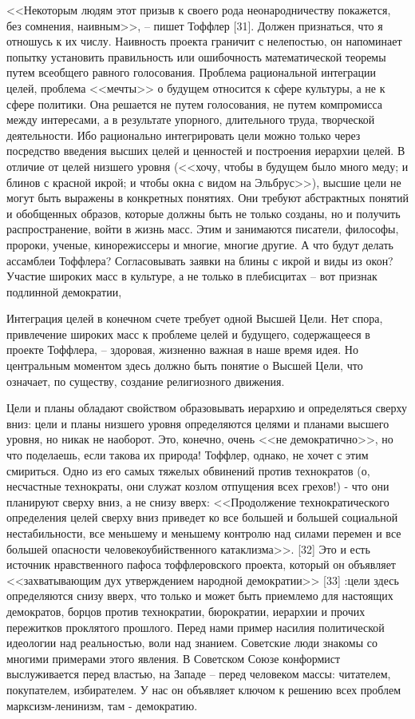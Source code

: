 \documentclass{book}
\begin{document}
{<<Некоторым людям этот призыв к своего рода неонародни­честву покажется, без сомнения, наивным>>, -- пишет Тоф­флер [31]. Должен признаться, что я отношусь к их числу. Наив­ность проекта граничит с нелепостью, он напоминает попытку установить правильность или ошибочность математической те­оремы путем всеобщего равного голосования. Проблема раци­ональной интеграции целей, проблема <<мечты>> о будущем от­носится к сфере культуры, а не к сфере политики. Она решает­ся не путем голосования, не путем компромисса между инте­ресами, а в результате упорного, длительного труда, творче­ской деятельности. Ибо рационально интегрировать цели можно только через посредство введения высших целей и ценностей и построения иерархии целей. В отличие от целей низшего уров­ня (<<хочу, чтобы в будущем было много меду; и блинов с крас­ной икрой; и чтобы окна с видом на Эльбрус>>), высшие цели не могут быть выражены в конкретных понятиях. Они требуют абстрактных понятий и обобщенных образов, которые должны быть не только созданы, но и 
получить распространение, войти в жизнь масс. Этим и занимаются писатели, философы, пророки, ученые, кинорежиссеры и многие, многие другие. А что будут делать ассамблеи Тоффлера? Согласовывать заявки на блины с икрой и виды из окон? Участие широких масс в культуре, а не только в плебисцитах -- вот признак подлинной демокра­тии,

Интеграция целей в конечном счете требует одной Высшей Цели. Нет спора, привлечение широких масс к проблеме целей и будущего, содержащееся в проекте Тоффлера, -- здоровая, жизненно важная в наше время идея. Но центральным момен­том здесь должно быть понятие о Высшей Цели, что означает, по существу, создание религиозного движения.

Цели и планы обладают свойством образовывать иерархию и определяться сверху вниз: цели и планы низшего уровня определяются целями и планами высшего уровня, но никак не наоборот. Это, конечно, очень <<не демократично>>, но что поде­лаешь, если такова их природа! Тоффлер, однако, не хочет с этим смириться. Одно из его самых тяжелых обвинений против технократов (о, несчастные технократы, они служат козлом отпущения всех грехов!) - что они планируют сверху вниз, а не снизу вверх: <<Продолжение технократического определения целей сверху вниз приведет ко все большей и большей социаль­ной нестабильности, все меньшему и меньшему контролю над си­лами перемен и все большей опасности человекоубийственного катаклизма>>. [32] Это и есть источник нравственного пафоса тоффлеровского проекта, который он объявляет <<захватыва­ющим дух утверждением народной демократии>> [33] :цели здесь определяются снизу вверх, что только и может быть приемлемо для настоящих демократов, борцов против технократии, бю­рократии, иерархии и прочих 
пережитков проклятого прошлого. Перед нами пример насилия политической идеологии над реаль­ностью, воли над знанием. Советские люди знакомы со многи­ми примерами этого явления. В Советском Союзе конформист выслуживается перед властью, на Западе -- перед человеком мас­сы: читателем, покупателем, избирателем. У нас он объявляет ключом к решению всех проблем марксизм-ленинизм, там - демократию.

}
\end{document}
